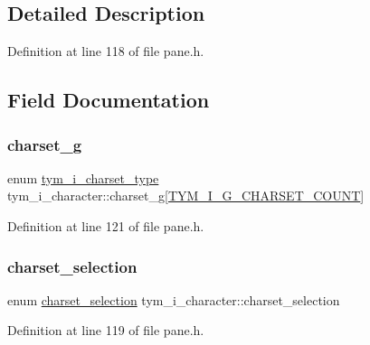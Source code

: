 \subsection{Detailed Description}


Definition at line 118 of file pane.\+h.



\subsection{Field Documentation}
\mbox{\label{structtym__i__character_a6cc0f4a423aacfba65d2b9df6109ac03}} 
\subsubsection{\texorpdfstring{charset\+\_\+g}{charset\_g}}
{\footnotesize\ttfamily enum \hyperlink{charset_8h_aec311a13b718c6327abd094839df7146}{tym\+\_\+i\+\_\+charset\+\_\+type} tym\+\_\+i\+\_\+character\+::charset\+\_\+g\mbox{[}\hyperlink{pane_8h_a0411cd49bb5b71852cecd93bcbf0ca2da4d2fa1719aa429e38bbd477d3a38634b}{T\+Y\+M\+\_\+\+I\+\_\+\+G\+\_\+\+C\+H\+A\+R\+S\+E\+T\+\_\+\+C\+O\+U\+NT}\mbox{]}}



Definition at line 121 of file pane.\+h.

\mbox{\label{structtym__i__character_a03e1385411863f05f23f05aa453db5f6}} 
\subsubsection{\texorpdfstring{charset\+\_\+selection}{charset\_selection}}
{\footnotesize\ttfamily enum \hyperlink{charset_8h_ac56946240a6c0621eb2162e6a7e85493}{charset\+\_\+selection} tym\+\_\+i\+\_\+character\+::charset\+\_\+selection}



Definition at line 119 of file pane.\+h.

\mbox{\label{structtym__i__character_aa38c672dcb8dba6d8f651132ae2655b3}} 
